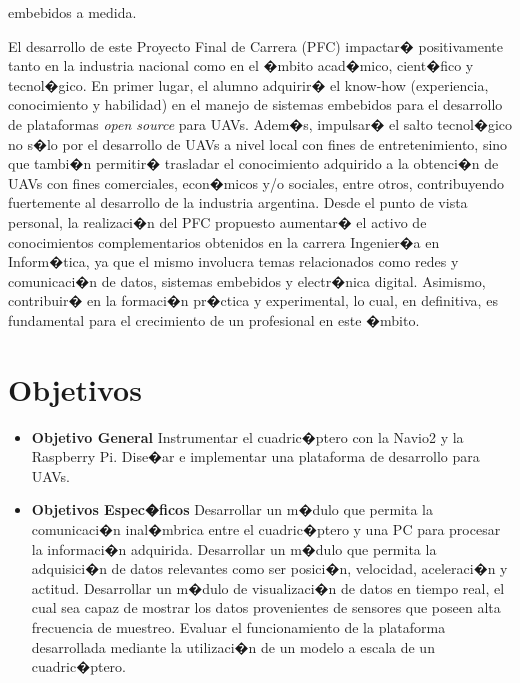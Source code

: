 embebidos a medida.
\par El desarrollo de este Proyecto Final de Carrera (PFC) impactar� positivamente tanto en la industria nacional como en el �mbito acad�mico, cient�fico y tecnol�gico. En primer lugar, el alumno adquirir� el know-how (experiencia, conocimiento y habilidad) en el manejo de sistemas embebidos para el desarrollo de plataformas \textit{open source} para UAVs. Adem�s, impulsar� el salto tecnol�gico no s�lo por el desarrollo de UAVs a nivel local con fines de entretenimiento, sino que tambi�n permitir� trasladar el conocimiento adquirido a la obtenci�n de UAVs con fines comerciales, econ�micos y/o sociales, entre otros, contribuyendo fuertemente al desarrollo de la industria argentina. Desde el punto de vista personal, la realizaci�n del PFC propuesto aumentar� el activo de conocimientos complementarios obtenidos en la carrera Ingenier�a en Inform�tica, ya que el mismo involucra temas relacionados como redes y comunicaci�n de datos, sistemas embebidos y electr�nica digital. Asimismo, contribuir� en la formaci�n pr�ctica y experimental, lo cual, en definitiva, es fundamental para el crecimiento de un profesional en este �mbito.

\section{Objetivos}

\begin{itemize}
	\item \textbf{Objetivo General}
		\subitem Instrumentar el cuadric�ptero con la Navio2 y la Raspberry Pi.
		\subitem Dise�ar e implementar una plataforma de desarrollo para UAVs.
	\item \textbf{Objetivos Espec�ficos}
		\subitem Desarrollar un m�dulo que permita la comunicaci�n inal�mbrica entre el
		cuadric�ptero y una PC para procesar la informaci�n adquirida.
		\subitem Desarrollar un m�dulo que permita la adquisici�n de datos relevantes como ser
		posici�n, velocidad, aceleraci�n y actitud.
		\subitem  Desarrollar un m�dulo de visualizaci�n de datos en tiempo real, el cual sea
		capaz de mostrar los datos provenientes de sensores que poseen alta
		frecuencia de muestreo.
		\subitem Evaluar el funcionamiento de la plataforma desarrollada mediante la utilizaci�n
		de un modelo a escala de un cuadric�ptero.
	
\end{itemize}



